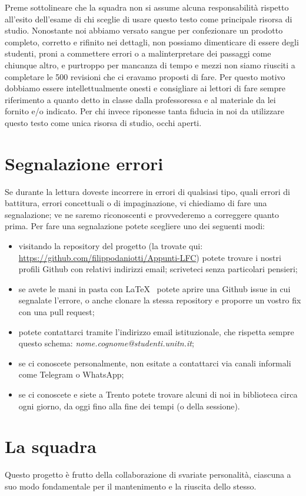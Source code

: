 \documentclass[class=book, crop=false, oneside, 12pt]{standalone}
\begin{document}
Preme sottolineare che la squadra non si assume alcuna responsabilità rispetto all'esito dell'esame di chi sceglie di usare questo testo come principale risorsa di studio. Nonostante noi abbiamo versato sangue per confezionare un prodotto completo, corretto e rifinito nei dettagli, non possiamo dimenticare di essere degli studenti, proni a commettere errori o a malinterpretare dei passaggi come chiunque altro, e purtroppo per mancanza di tempo e mezzi non siamo riusciti a completare le 500 revisioni che ci eravamo proposti di fare. Per questo motivo dobbiamo essere intellettualmente onesti e consigliare ai lettori di fare sempre riferimento a quanto detto in classe dalla professoressa e al materiale da lei fornito e/o indicato. Per chi invece riponesse tanta fiducia in noi da utilizzare questo testo come unica risorsa di studio, occhi aperti.

\section*{Segnalazione errori}
Se durante la lettura doveste incorrere in errori di qualsiasi tipo, quali errori di battitura, errori concettuali o di impaginazione, vi chiediamo di fare una segnalazione; ve ne saremo riconoscenti e provvederemo a correggere quanto prima. Per fare una segnalazione potete scegliere uno dei seguenti modi:
\begin{itemize}
    \item visitando la repository del progetto (la trovate qui: \url{https://github.com/filippodaniotti/Appunti-LFC}) potete trovare i nostri profili Github con relativi indirizzi email; scriveteci senza particolari pensieri;
    \item se avete le mani in pasta con \LaTeX~ potete aprire una Github issue in cui segnalate l'errore, o anche clonare la stessa repository e proporre un vostro fix con una pull request;
    \item potete contattarci tramite l'indirizzo email istituzionale, che rispetta sempre questo schema: \textit{nome.cognome@studenti.unitn.it};
    \item se ci conoscete personalmente, non esitate a contattarci via canali informali come Telegram o WhatsApp;
    \item se ci conoscete e siete a Trento potete trovare alcuni di noi in biblioteca circa ogni giorno, da oggi fino alla fine dei tempi (o della sessione).
\end{itemize}

\section*{La squadra}
Questo progetto è frutto della collaborazione di svariate personalità, ciascuna a suo modo fondamentale per il mantenimento e la riuscita dello stesso.
\end{document}

